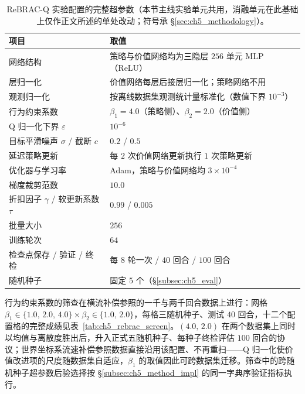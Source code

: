 \begin{table}[t]
\centering
\caption{ReBRAC-Q 实验配置的完整超参数（本节主线实验单元共用，消融单元在此基础上仅作正文所述的单处改动；符号承 \S\ref{sec:ch5_methodology}）。}
\label{tab:ch5_rebrac_hparams}
\setlength{\tabcolsep}{5pt}
\begin{tabular}{l l}
\toprule
\textbf{项目} & \textbf{取值} \\
\midrule
网络结构 & 策略与价值网络均为三隐层 $256$ 单元 MLP（ReLU） \\
层归一化 & 价值网络每层后接层归一化；策略网络不用 \\
观测归一化 & 按离线数据集观测统计量标准化（数值下界 $10^{-3}$） \\
行为约束系数 & $\beta_1 = 4.0$（策略侧）、$\beta_2 = 2.0$（价值侧） \\
Q 归一化下界 $\varepsilon$ & $10^{-6}$ \\
目标平滑噪声 $\sigma$ / 截断 $c$ & $0.2$ / $0.5$ \\
延迟策略更新 & 每 $2$ 次价值网络更新执行 $1$ 次策略更新 \\
优化器与学习率 & Adam，策略与价值网络均 $3 \times 10^{-4}$ \\
梯度裁剪范数 & $10.0$ \\
折扣因子 $\gamma$ / 软更新系数 $\tau$ & $0.99$ / $0.005$ \\
批量大小 & $256$ \\
训练轮次 & $64$ \\
检查点保存 / 验证 / 终检 & 每 $8$ 轮一次 / $40$ 回合 / $100$ 回合 \\
随机种子 & 固定 $5$ 个（\S\ref{subsec:ch5_eval}） \\
\bottomrule
\end{tabular}
\end{table}

行为约束系数的筛查在横流补偿参照的一千与两千回合数据上进行：网格 $\beta_1 \in \{1.0,\,2.0,\,4.0\} \times \beta_2 \in \{1.0,\,2.0\}$，每格三随机种子、测试 $40$ 回合，十二个配置格的完整成绩见表~\ref{tab:ch5_rebrac_screen}。$(4.0,\,2.0)$ 在两个数据集上同时以均值与离散度胜出后，升入正式五随机种子、每种子终检评估 $100$ 回合的协议；世界坐标系流速补偿参照数据直接沿用该配置、不再重扫——Q 归一化使价值改进项的尺度随数据集自适应，$\beta_1$ 的取值因此可跨数据集迁移。筛查中的跨随机种子超参数后验选择按 \S\ref{subsec:ch5_method_impl} 的同一字典序验证指标执行。

